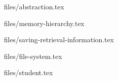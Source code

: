 \documentclass[12px]{article}
\begin{document}
    
    \begin{titlepage}
        \vspace{1 cm}
        \contribute
    \end{titlepage}

    \newpage
    \tableofcontents

    \newpage
    \subject{انتزاع}{files/abstraction.tex}
    \subject{سلسه مراتب حافظه}{files/memory-hierarchy.tex}
    \subject{ذخیره‌سازی و بازیابی فایل}{files/saving-retrieval-information.tex}
    \newpage
    \subject{فایل سیسیتم}{files/file-system.tex}
    \subject{Page و Record}{files/student.tex}
    \newpage
    \nocite{*}
    
    
\end{document}
